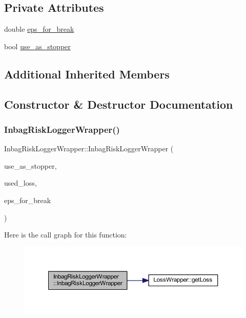 \subsection*{Private Attributes}
\begin{DoxyCompactItemize}
\item 
double \mbox{\hyperlink{class_inbag_risk_logger_wrapper_ae1731a184b5cae28fd5981ffd6daeec7}{eps\+\_\+for\+\_\+break}}
\item 
bool \mbox{\hyperlink{class_inbag_risk_logger_wrapper_aca25b80855d0f8dcf9b59a4d544ecca8}{use\+\_\+as\+\_\+stopper}}
\end{DoxyCompactItemize}
\subsection*{Additional Inherited Members}


\subsection{Constructor \& Destructor Documentation}
\mbox{\label{class_inbag_risk_logger_wrapper_a6b23be0fa48dd767089a8a11e340e784}} 
\subsubsection{\texorpdfstring{Inbag\+Risk\+Logger\+Wrapper()}{InbagRiskLoggerWrapper()}}
{\footnotesize\ttfamily Inbag\+Risk\+Logger\+Wrapper\+::\+Inbag\+Risk\+Logger\+Wrapper (\begin{DoxyParamCaption}\item[{bool}]{use\+\_\+as\+\_\+stopper,  }\item[{\mbox{\hyperlink{class_loss_wrapper}{Loss\+Wrapper}} \&}]{used\+\_\+loss,  }\item[{double}]{eps\+\_\+for\+\_\+break }\end{DoxyParamCaption})\hspace{0.3cm}{\ttfamily [inline]}}

Here is the call graph for this function\+:\nopagebreak
\begin{figure}[H]
\begin{center}
\leavevmode
\includegraphics[width=350pt]{class_inbag_risk_logger_wrapper_a6b23be0fa48dd767089a8a11e340e784_cgraph}
\end{center}
\end{figure}


